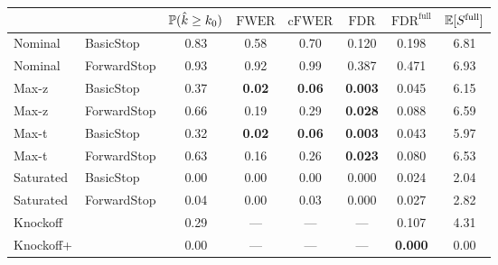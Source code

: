 
\newcommand{\guarantee}[1]{{\bf #1}}
{\small 
\begin{tabular}{|l l|cccccc|}
\hline
{} & {} &  $\mathbb{P}(\hat{k} \geq k_0)$ &  $\text{FWER}$ &  $\text{cFWER}$ &  $\text{FDR}$ &  $\text{FDR}^{\text{full}}$ &  $\mathbb{E}[S^{\text{full}}]$ \\ \hline
Nominal & BasicStop & 0.83 & 0.58 & 0.70 & 0.120 & 0.198 & 6.81 \\ 
Nominal & ForwardStop & 0.93 & 0.92 & 0.99 & 0.387 & 0.471 & 6.93 \\ 
Max-z & BasicStop & 0.37 & \guarantee{0.02} & \guarantee{0.06} & \guarantee{0.003} & 0.045 & 6.15 \\ 
Max-z & ForwardStop & 0.66 & 0.19 & 0.29 & \guarantee{0.028} & 0.088 & 6.59 \\ 
Max-t & BasicStop & 0.32 & \guarantee{0.02} & \guarantee{0.06} & \guarantee{0.003} & 0.043 & 5.97 \\ 
Max-t & ForwardStop & 0.63 & 0.16 & 0.26 & \guarantee{0.023} & 0.080 & 6.53 \\ 
Saturated & BasicStop & 0.00 & 0.00 & 0.00 & 0.000 & 0.024 & 2.04 \\ 
Saturated & ForwardStop & 0.04 & 0.00 & 0.03 & 0.000 & 0.027 & 2.82 \\ 
Knockoff & & 0.29 & --- & --- & --- & 0.107 & 4.31 \\ 
Knockoff+ & & 0.00 & --- & --- & --- & \guarantee{0.000} & 0.00 \\  \hline
\end{tabular}}